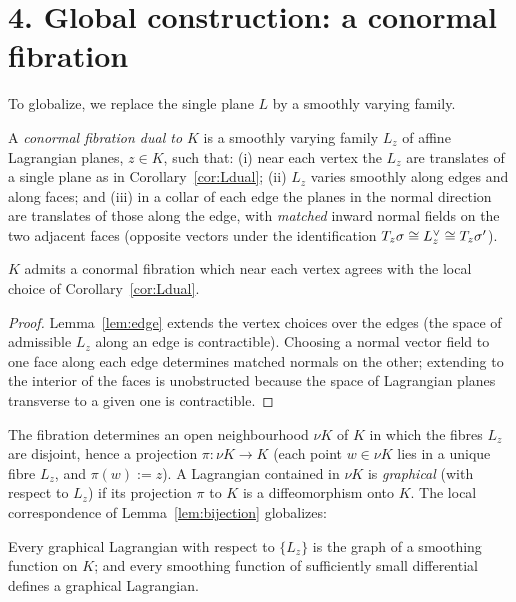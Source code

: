 \section*{4. Global construction: a conormal fibration}

To globalize, we replace the single plane $L$ by a smoothly varying family.

\begin{qeightdefinition}\label{def:fibration}
A \emph{conormal fibration dual to $K$} is a smoothly varying family $L_z$ of
affine Lagrangian planes, $z\in K$, such that: (i) near each vertex the $L_z$ are
translates of a single plane as in Corollary~\ref{cor:Ldual}; (ii) $L_z$ varies
smoothly along edges and along faces; and (iii) in a collar of each edge the
planes in the normal direction are translates of those along the edge, with
\emph{matched} inward normal fields on the two adjacent faces (opposite vectors
under the identification $T_z\sigma\cong L^{\vee}_z\cong T_z\sigma'$).
\end{qeightdefinition}

\begin{qeightlemma}\label{lem:fibexists}
$K$ admits a conormal fibration which near each vertex agrees with the local
choice of Corollary~\ref{cor:Ldual}.
\end{qeightlemma}

\begin{proof}
Lemma~\ref{lem:edge} extends the vertex choices over the edges (the space of
admissible $L_z$ along an edge is contractible). Choosing a normal vector field
to one face along each edge determines matched normals on the other; extending to
the interior of the faces is unobstructed because the space of Lagrangian planes
transverse to a given one is contractible.
\end{proof}

The fibration determines an open neighbourhood $\nu K$ of $K$ in which the fibres
$L_z$ are disjoint, hence a projection $\pi\colon\nu K\to K$ (each point $w\in\nu K$
lies in a unique fibre $L_z$, and $\pi(w):=z$). A Lagrangian contained in
$\nu K$ is \emph{graphical} (with respect to $L_z$) if its projection $\pi$ to $K$
is a diffeomorphism onto $K$. The local correspondence of
Lemma~\ref{lem:bijection} globalizes:

\begin{qeightlemma}\label{lem:graph-global}
Every graphical Lagrangian with respect to $\{L_z\}$ is the graph of a smoothing
function on $K$; and every smoothing function of sufficiently small differential
defines a graphical Lagrangian.
\end{qeightlemma}


